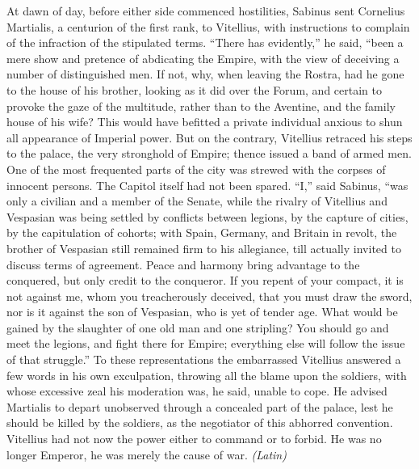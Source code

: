 At dawn of day, before either side commenced hostilities, Sabinus sent Cornelius Martialis, a centurion of the first rank, to Vitellius, with instructions to complain of the infraction of the stipulated terms. ``There has evidently,'' he said, ``been a mere show and pretence of abdicating the Empire, with the view of deceiving a number of distinguished men. If not, why, when leaving the Rostra, had he gone to the house of his brother, looking as it did over the Forum, and certain to provoke the gaze of the multitude, rather than to the Aventine, and the family house of his wife? This would have befitted a private individual anxious to shun all appearance of Imperial power. But on the contrary, Vitellius retraced his steps to the palace, the very stronghold of Empire; thence issued a band of armed men. One of the most frequented parts of the city was strewed with the corpses of innocent persons. The Capitol itself had not been spared. ``I,'' said Sabinus, ``was only a civilian and a member of the Senate, while the rivalry of Vitellius and Vespasian was being settled by conflicts between legions, by the capture of cities, by the capitulation of cohorts; with Spain, Germany, and Britain in revolt, the brother of Vespasian still remained firm to his allegiance, till actually invited to discuss terms of agreement. Peace and harmony bring advantage to the conquered, but only credit to the conqueror. If you repent of your compact, it is not against me, whom you treacherously deceived, that you must draw the sword, nor is it against the son of Vespasian, who is yet of tender age. What would be gained by the slaughter of one old man and one stripling? You should go and meet the legions, and fight there for Empire; everything else will follow the issue of that struggle.'' To these representations the embarrassed Vitellius answered a few words in his own exculpation, throwing all the blame upon the soldiers, with whose excessive zeal his moderation was, he said, unable to cope. He advised Martialis to depart unobserved through a concealed part of the palace, lest he should be killed by the soldiers, as the negotiator of this abhorred convention. Vitellius had not now the power either to command or to forbid. He was no longer Emperor, he was merely the cause of war. \emph{(Latin)}


